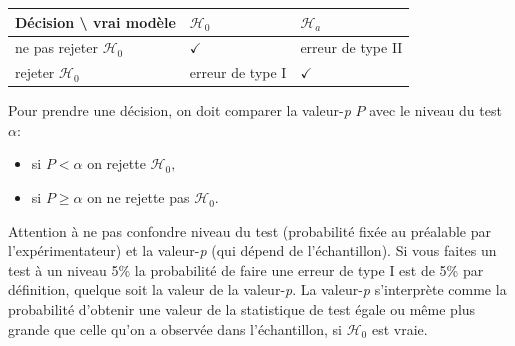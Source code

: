 \documentclass[
  11pt,
  letterpaper,
]{scrbook}
\providecommand{\tightlist}{%
  \setlength{\itemsep}{0pt}\setlength{\parskip}{0pt}}\usepackage{longtable,booktabs,array}
\theoremstyle{plain}
\theoremstyle{plain}
\theoremstyle{definition}
\theoremstyle{definition}
\theoremstyle{remark}
\begin{document}
\begin{longtable}[]{@{}
  >{\raggedright\arraybackslash}p{}
  >{\centering\arraybackslash}p{}
  >{\centering\arraybackslash}p{}@{}}
\toprule\noalign{}
\begin{minipage}[b]{\linewidth}\raggedright
\textbf{Décision} \textbackslash{} \textbf{vrai modèle}
\end{minipage} & \begin{minipage}[b]{\linewidth}\centering
\(\mathscr{H}_0\)
\end{minipage} & \begin{minipage}[b]{\linewidth}\centering
\(\mathscr{H}_a\)
\end{minipage} \\
\midrule\noalign{}
\endhead
\bottomrule\noalign{}
\endlastfoot
ne pas rejeter \(\mathscr{H}_0\) & \(\checkmark\) & erreur de type II \\
rejeter \(\mathscr{H}_0\) & erreur de type I & \(\checkmark\) \\
\end{longtable}

Pour prendre une décision, on doit comparer la valeur-\emph{p} \(P\)
avec le niveau du test \(\alpha\):

\begin{itemize}
\tightlist
\item
  si \(P < \alpha\) on rejette \(\mathscr{H}_0,\)
\item
  si \(P \geq \alpha\) on ne rejette pas \(\mathscr{H}_0.\)
\end{itemize}

Attention à ne pas confondre niveau du test (probabilité fixée au
préalable par l'expérimentateur) et la valeur-\emph{p} (qui dépend de
l'échantillon). Si vous faites un test à un niveau 5\% la probabilité de
faire une erreur de type I est de 5\% par définition, quelque soit la
valeur de la valeur-\emph{p}. La valeur-\emph{p} s'interprète comme la
probabilité d'obtenir une valeur de la statistique de test égale ou même
plus grande que celle qu'on a observée dans l'échantillon, si
\(\mathscr{H}_0\) est vraie.
\end{document}
